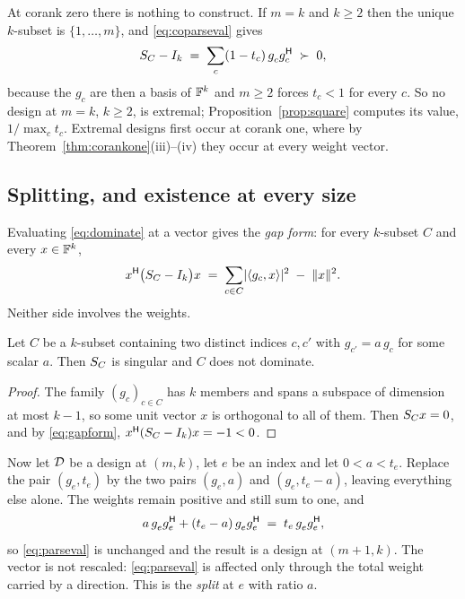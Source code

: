 At corank zero there is nothing to construct.  If $m=k$ and $k\ge2$ then
the unique $k$-subset is $\{1,\dots,m\}$, and \eqref{eq:coparseval} gives
\[
  \SC-I_k\;=\;\sum_{c}(1-t_c)\,g_c^{\vphantom{\mathsf{H}}}g_c\adj\;\pd\;0 ,
\]
because the $g_c$ are then a basis of $\mathbb{F}^k$ and $m\ge2$ forces $t_c<1$
for every $c$.  So no design at $m=k$, $k\ge2$, is extremal;
Proposition~\ref{prop:square} computes its value, $1/\max_ct_c$.  Extremal
designs first occur at corank one, where by
Theorem~\ref{thm:corankone}(iii)--(iv) they occur at every weight vector.

\subsection{Splitting, and existence at every size}\label{sec:split}

Evaluating \eqref{eq:dominate} at a vector gives the \emph{gap form}: for
every $k$-subset $C$ and every $x\in\mathbb{F}^k$,
\begin{equation}\label{eq:gapform}
  x^{\mathsf{H}}\bigl(S_{C}-I_k\bigr)x
  \;=\;\sum_{c\in C}\lvert\langle g_c,x\rangle\rvert^{2}
       \;-\;\lVert x\rVert^{2}.
\end{equation}
Neither side involves the weights.

\begin{lemma}\label{lem:parallel}
Let $C$ be a $k$-subset containing two distinct indices $c,c'$ with
$g_{c'}=a\,g_c$ for some scalar $a$.  Then $S_{C}$ is singular and $C$
does not dominate.
\end{lemma}

\begin{proof}
The family $(g_c)_{c\in C}$ has $k$ members and spans a subspace of
dimension at most $k-1$, so some unit vector $x$ is orthogonal to all of
them.  Then $S_{C} x=0$, and by \eqref{eq:gapform},
$x^{\mathsf{H}}(S_{C}-I_k)x=-1<0$.
\end{proof}

Now let $\mathcal{D}$ be a design at $(m,k)$, let $e$ be an index and let
$0<a<t_e$.  Replace the pair $(g_e,t_e)$ by the two pairs $(g_e,a)$ and
$(g_e,t_e-a)$, leaving everything else alone.  The weights remain positive
and still sum to one, and
\[
  a\,g_e^{\vphantom{\mathsf{H}}}g_e\adj+(t_e-a)\,g_e^{\vphantom{\mathsf{H}}}g_e\adj
  \;=\;t_e\,g_e^{\vphantom{\mathsf{H}}}g_e\adj,
\]
so \eqref{eq:parseval} is unchanged and the result is a design at
$(m+1,k)$.  The vector is not rescaled: \eqref{eq:parseval} is affected
only through the total weight carried by a direction.  This is the
\emph{split} at $e$ with ratio $a$.

